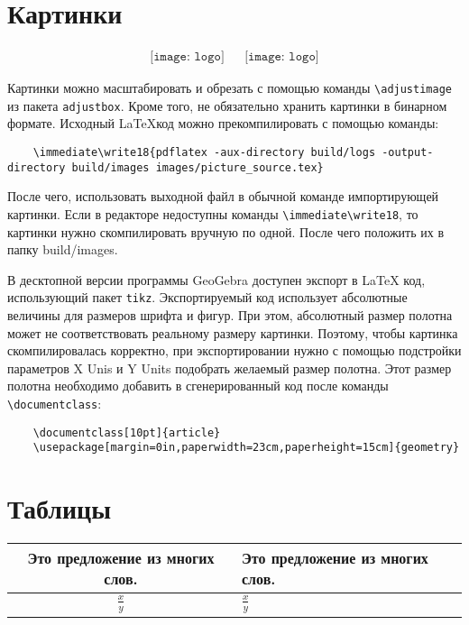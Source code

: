 \section{Картинки}

\begin{align*}
    \texttt{[image: logo]}
     &  &
    \texttt{[image: logo]}
\end{align*}
\begin{center}
\end{center}
Картинки можно масштабировать и обрезать с помощью команды \verb|\adjustimage| из пакета \verb|adjustbox|.
Кроме того, не обязательно хранить картинки в бинарном формате.
Исходный \LaTeX\:код можно прекомпилировать с помощью команды:
\begin{lstlisting}
    \immediate\write18{pdflatex -aux-directory build/logs -output-directory build/images images/picture_source.tex}
\end{lstlisting}
После чего, использовать выходной файл в обычной команде импортирующей картинки.
Если в редакторе недоступны команды \verb|\immediate\write18|, то картинки нужно скомпилировать вручную по одной.
После чего положить их в папку build/images.

В десктопной версии программы GeoGebra доступен экспорт в \LaTeX\: код, использующий пакет \verb|tikz|.
Экспортируемый код использует абсолютные величины для размеров шрифта и фигур.
При этом, абсолютный размер полотна может не соответствовать реальному размеру картинки.
Поэтому, чтобы картинка скомпилировалась корректно, при экспортировании нужно с помощью подстройки параметров X Unis и Y Units подобрать желаемый размер полотна.
Этот размер полотна необходимо добавить в сгенерированный код после команды \verb|\documentclass|:
\begin{lstlisting}
    \documentclass[10pt]{article}
    \usepackage[margin=0in,paperwidth=23cm,paperheight=15cm]{geometry}
\end{lstlisting}

\section{Таблицы}

\setlength{\extrarowheight}{5mm}
\begin{tabular}{|cp{4cm}|} %
    \hline
    Это предложение из многих слов. &
    Это предложение из многих слов.
    \\
    \hline
    $\displaystyle \frac{x}{y}$     &
    $\displaystyle \frac{x}{y}$
    \\[5mm] %
    \hline
\end{tabular}
\setlength{\extrarowheight}{0mm}
\\

